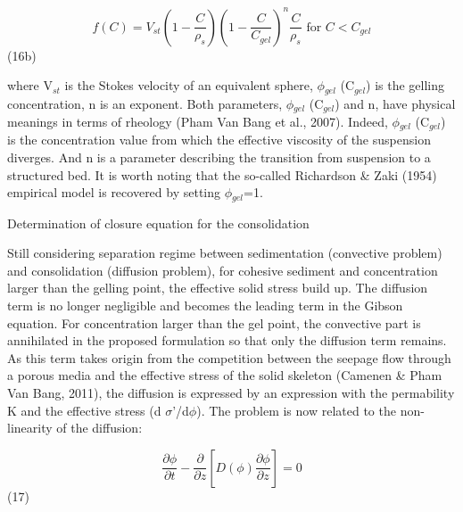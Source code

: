 \begin{equation*}
f(C)=V_{st} (1-\dfrac{C}{\rho _{s} } )\left( 1-\dfrac{C}{C_{gel} } \right)
^{n} \dfrac{C}{\rho _{s} } \text{\ \ \ for\ \ \ } C<C_{gel} 
\end{equation*}%
\hspace{5mm} \hspace{5mm} \hspace{5mm} \hspace{5mm} \hspace{5mm} (16b)

where V$_{st}$ is the Stokes velocity of an equivalent sphere, $\phi$$_{gel}$
(C$_{gel}$) is the gelling concentration, n is an exponent. Both parameters, 
$\phi$$_{gel}$ (C$_{gel}$) and n, have physical meanings in terms of
rheology (Pham Van Bang et al., 2007). Indeed, $\phi$$_{gel}$ (C$_{gel}$) is
the concentration value from which the effective viscosity of the suspension
diverges. And n is a parameter describing the transition from suspension to
a structured bed. It is worth noting that the so-called Richardson \& Zaki
(1954) empirical model is recovered by setting $\phi$$_{gel}$=1.

Determination of closure equation for the consolidation

Still considering separation regime between sedimentation (convective
problem) and consolidation (diffusion problem), for cohesive sediment and
concentration larger than the gelling point, the effective solid stress
build up. The diffusion term is no longer negligible and becomes the leading
term in the Gibson equation. For concentration larger than the gel point,
the convective part is annihilated in the proposed formulation so that only
the diffusion term remains. As this term takes origin from the competition
between the seepage flow through a porous media and the effective stress of
the solid skeleton (Camenen \& Pham Van Bang, 2011), the diffusion is
expressed by an expression with the permability K and the effective stress (d%
$\sigma$'/d$\phi$). The problem is now related to the non-linearity of the
diffusion:

\begin{equation*}
\dfrac{\partial \phi }{\partial t} -\dfrac{\partial }{\partial z} \left[
D(\phi )\dfrac{\partial \phi }{\partial z} \right] =0 
\end{equation*}%
\hspace{5mm} \hspace{5mm} \hspace{5mm} \hspace{5mm} \hspace{5mm} \hspace{5mm}
(17)

